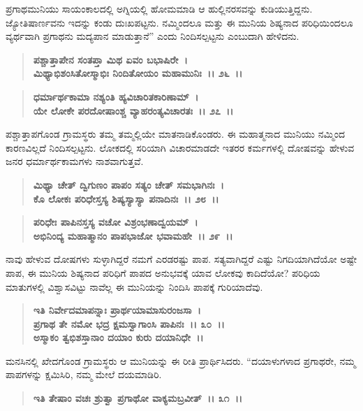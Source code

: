 ಪ್ರಗಾಥಮುನಿಯು ಸಾಯಂಕಾಲದಲ್ಲಿ ಅಗ್ನಿಯಲ್ಲಿ ಹೋಮಮಾಡಿ ಆ ಹುಲ್ಲಿನರಸವನ್ನು ಕುಡಿಯುತ್ತಿದ್ದನು. ಜ್ಯೋತಿಷಾರ್ಣವನು ಇದನ್ನು ಕಂಡು ದುಃಖಪಟ್ಟನು. ನಮ್ಮಿಂದಲೂ ಮತ್ತು ಈ ಮುನಿಯ ಶಿಷ್ಯನಾದ ಪರಿಧಿಯಿಂದಲೂ ವ್ಯರ್ಥವಾಗಿ ಪ್ರಗಾಥನು ಮದ್ಯಪಾನ ಮಾಡುತ್ತಾನೆ” ಎಂದು ನಿಂದಿಸಲ್ಪಟ್ಟನು ಎಂಬುದಾಗಿ ಹೇಳಿದನು.

\begin{verse}
\textbf{ಪಶ್ಚಾತ್ತಾಪೇನ ಸಂತಪ್ತಾ ಮಿಥ ಏವಂ ಬಭಾಷಿರೇ~।}\\\textbf{ಮಿಥ್ಯಾಭಿಶಂಸಿತೋಸ್ಮಾಭಿಃ ನಿಂದಿತೋಯಂ ಮಹಾಮುನಿಃ~।। ೨೬~।।} 
\end{verse}

\begin{verse}
\textbf{ಧರ್ಮಾರ್ಥಕಾಮಾ ನಶ್ಯಂತಿ ಹ್ಯವಿಚಾರಿತಕಾರಿಣಾಮ್~।}\\\textbf{ಯೇ ಲೋಕೇ ಪರದೋಷಾಂಶ್ಚ ವ್ಯಾಹರಂತ್ಯವಿಚಾರತಃ~।। ೨೭~।।}
\end{verse}

ಪಶ್ಚಾತ್ತಾಪಗೊಂಡ ಗ್ರಾಮಸ್ಥರು ತಮ್ಮ ತಮ್ಮಲ್ಲಿಯೇ ಮಾತನಾಡಿಕೊಂಡರು. ಈ ಮಹಾತ್ಮನಾದ ಮುನಿಯು ನಮ್ಮಿಂದ ಕಾರಣವಿಲ್ಲದೆ ನಿಂದಿಸಲ್ಪಟ್ಟನು. ಲೋಕದಲ್ಲಿ ಸರಿಯಾಗಿ ವಿಚಾರಮಾಡದೇ ಇತರರ ಕರ್ಮಗಳಲ್ಲಿ ದೋಷವನ್ನು ಹೇಳುವ ಜನರ ಧರ್ಮಾರ್ಥಕಾಮಗಳು ನಾಶವಾಗುತ್ತವೆ.

\begin{verse}
\textbf{ಮಿಥ್ಯಾ ಚೇತ್ ದ್ವಿಗುಣಂ ಪಾಪಂ ಸತ್ಯಂ ಚೇತ್ ಸಮಭಾಗಿನಃ~।}\\\textbf{ಕೊ ಲೋಕಃ ಪರಿಧೇಸ್ತಸ್ಯ ಶಿಷ್ಯಸ್ಯಾಸ್ಯಾ ಪನಾದಿನಃ~।। ೨೮~।। }
\end{verse}

\begin{verse}
\textbf{ಪರಿಧೇಃ ಪಾಪಿನಸ್ತಸ್ಯ ವಚೋ ವಿಶ್ರಂಭಣಾದ್ವಯಮ್~।}\\\textbf{ಅಭಿನಿಂದ್ಯ ಮಹಾತ್ಮಾನಂ ಪಾಪಭಾಜೋ ಭವಾಮಹೇ~।। ೨೯~।।}
\end{verse}

ನಾವು ಹೇಳುವ ದೋಷಗಳು ಸುಳ್ಳಾಗಿದ್ದರೆ ನಮಗೆ ಎರಡರಷ್ಟು ಪಾಪ. ಸತ್ಯವಾಗಿದ್ದರೆ ಎಷ್ಟು ನಿಗದಿಯಾಗಿದೆಯೋ ಅಷ್ಟೇ ಪಾಪ, ಈ ಮುನಿಯ ಶಿಷ್ಯನಾದ ಪರಿಧಿಗೆ ಪಾಪದ ಅನುಭವಕ್ಕೆ ಯಾವ ಲೋಕವು ಕಾದಿದೆಯೋ? ಪರಿಧಿಯ ಮಾತುಗಳಲ್ಲಿ ವಿಶ್ವಾಸವಿಟ್ಟು ನಾವೆಲ್ಲ ಈ ಮುನಿಯನ್ನು ನಿಂದಿಸಿ ಪಾಪಕ್ಕೆ ಗುರಿಯಾದೆವು.

\begin{verse}
\textbf{ಇತಿ ನಿರ್ವೇದಮಾಪನ್ನಾಃ ಪ್ರಾರ್ಥಯಾಮಾಸುರಂಜಸಾ~।}\\\textbf{ಪ್ರಗಾಥ ತೇ ನಮೋ ಭದ್ರ ಕ್ಷಮಸ್ವಾಗಾಂಸಿ ಪಾಪಿನಃ~।। ೩೦~।।}\\\textbf{ಅಸ್ಮಾಕಂ ತ್ವಭಿಶಸ್ತಾನಾಂ ದಯಾಂ ಕುರು ದಯಾನಿಧೇ~।।}
\end{verse}

ಮನಸಿನಲ್ಲಿ ಖೇದಗೊಂಡ ಗ್ರಾಮಸ್ಥರು ಆ ಮುನಿಯನ್ನು ಈ ರೀತಿ ಪ್ರಾರ್ಥಿಸಿದರು. “ದಯಾಳುಗಳಾದ ಪ್ರಗಾಥರೇ, ನಮ್ಮ ಪಾಪಗಳನ್ನು ಕ್ಷಮಿಸಿರಿ, ನಮ್ಮ ಮೇಲೆ ದಯಮಾಡಿರಿ.

\begin{verse}
\textbf{ಇತಿ ತೇಷಾಂ ವಚಃ ಶ್ರುತ್ವಾ ಪ್ರಗಾಥೋ ವಾಕ್ಯಮಬ್ರವೀತ್~।। ೩೧~।।}
\end{verse}

